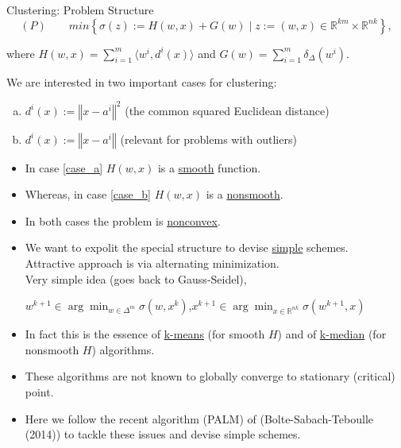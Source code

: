 \documentclass[9pt,handout]{beamer} %
\newcommand{\rr}{\mathbb{R}} %
\newcommand{\R}{\mathbb{R}} %
\newcommand{\norm}[1]{\left\Vert {#1} \right\Vert} %
\begin{document}
    \begin{frame}{Clustering: Problem Structure}
    	\begin{equation*}
			(P) \qquad min \left\lbrace \sigma(z) := H(w,x) + G(w) \mid z := (w,x) \in \R^{km} \times \R^{nk} \right\rbrace, 
		\end{equation*}
		\begin{center}
			where $H(w,x) = \sum\limits_{i=1}^{m} \langle w^i , d^i(x) \rangle$ and $G(w) = \sum\limits_{i=1}^{m} \delta_{\Delta}(w^i).$
		\end{center}
		We are interested in two important cases for clustering:
		\begin{enumerate}[(a)]
			\item $d^i(x):= \norm{x-a^i}^2$ (the common squared Euclidean distance)  \label{case_a}
			\item $d^i(x):= \norm{x-a^i}$ (relevant for problems with outliers) \label{case_b}
		\end{enumerate}
		\begin{itemize}[<+->]
			\item In case \eqref{case_a} $H(w,x)$ is a \underline{smooth} function.
			\item Whereas, in case \eqref{case_b} $H(w,x)$ is a \underline{nonsmooth}.
			\item In both cases the problem is \underline{nonconvex}.
			\item We want to expolit the special structure to devise \underline{simple} schemes.\\ Attractive approach is via {\dblue alternating minimization}.\\
    	Very simple idea (goes back to Gauss-Seidel),\\
    	\begin{center}
    		$w^{k+1} \in \arg\!\min_{w \in \Delta^m} \sigma\left(w, x^k\right)$,\quad $x^{k+1} \in \arg\!\min_{x \in \rr^{nk}} \sigma\left( w^{k+1},x\right)$
    	\end{center}
			\item In fact this is the essence of \underline{k-means} (for smooth $H$) and of \underline{k-median} (for nonsmooth $H$) algorithms.
			\item These algorithms are not known to globally converge to stationary (critical) point.
			\item Here we follow the recent algorithm (PALM) of {\dblue (Bolte-Sabach-Teboulle (2014))} to tackle these issues and devise simple schemes.    	
    	\end{itemize}
    \end{frame}
\end{document}

